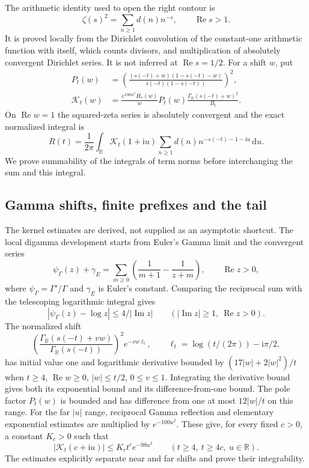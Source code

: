 \documentclass[11pt,a4paper]{article}
\numberwithin{equation}{section}
\theoremstyle{definition}
\newcommand{\R}{\mathbb R}
\newcommand{\dd}{\,\mathrm d}
\newcommand{\ii}{\mathrm i}
\newcommand{\Rea}{\operatorname{Re}}
\newcommand{\Ima}{\operatorname{Im}}
\begin{document}
The arithmetic identity used to open the right contour is
\[
 \zeta(s)^2=\sum_{n\ge1}d(n)n^{-s},\qquad \Rea s>1.
\]
It is proved locally from the Dirichlet convolution of the constant-one
arithmetic function with itself, which counts divisors, and multiplication of
absolutely convergent Dirichlet series. It is not inferred at $\Rea s=1/2$.
For a shift $w$, put
\begin{align*}
 P_t(w)&=\left(\frac{(s(-t)+w)(1-s(-t)-w)}{s(-t)(1-s(-t))}\right)^2,\\
 \mathcal K_t(w)&=\frac{e^{100w^2}H_*(w)}w P_t(w)
             \frac{\Gamma_{\R}(s(-t)+w)^2}{B_t}.
\end{align*}
On $\Rea w=1$ the squared-zeta series is absolutely convergent and the exact
normalized integral is
\[
 R(t)=\frac1{2\pi}\int_{\R}\mathcal K_t(1+\ii u)
              \sum_{n\ge1}d(n)n^{-s(-t)-1-\ii u}\dd u.
\]
We prove summability of the integrals of term norms before interchanging
the sum and this integral.

\subsection{Gamma shifts, finite prefixes and the tail}
The kernel estimates are derived, not supplied as an asymptotic shortcut. The
local digamma development starts from Euler's Gamma limit and the convergent
series
\[
 \psi_\Gamma(z)+\gamma_E=\sum_{m\ge0}\left(\frac1{m+1}-\frac1{z+m}\right),
 \qquad \Rea z>0,
\]
where $\psi_\Gamma=\Gamma'/\Gamma$ and $\gamma_E$ is Euler's constant. Comparing
the reciprocal sum with the telescoping logarithmic integral gives
\[
 |\psi_\Gamma(z)-\log z|\le4/|\Ima z|\qquad(|\Ima z|\ge1,\ \Rea z>0).
\]
The normalized shift
\[
 \left(\frac{\Gamma_{\R}(s(-t)+vw)}{\Gamma_{\R}(s(-t))}\right)^2
 e^{-vw\ell_t},\qquad
 \ell_t=\log(t/(2\pi))-\ii\pi/2,
\]
has initial value one and logarithmic derivative bounded by
$(17|w|+2|w|^2)/t$ when $t\ge4$, $\Rea w\ge0$, $|w|\le t/2$,
$0\le v\le1$. Integrating the derivative bound gives both its exponential
bound and its difference-from-one bound. The pole factor $P_t(w)$ is bounded
and has difference from one at most $12|w|/t$ on this range. For the far
$|u|$ range, reciprocal Gamma reflection and elementary exponential estimates
are multiplied by $e^{-100u^2}$. These give, for every fixed $c>0$, a constant
$K_c>0$ such that
\begin{equation}\label{eq:fourthkernel}
 |\mathcal K_t(c+\ii u)|\le K_c t^c e^{-98u^2}
 \qquad(t\ge4,\ t\ge4c,\ u\in\R).
\end{equation}
The estimates explicitly separate near and far shifts and prove their
integrability.
\end{document}
